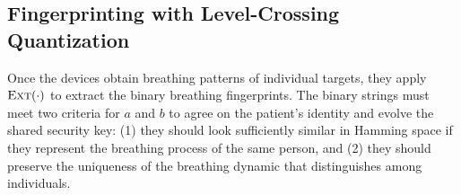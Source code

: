 
\subsection{Fingerprinting with Level-Crossing Quantization}
\label{section:respiration fingerprinting}


Once the devices obtain breathing patterns of individual targets, they apply $\textsc{Ext} (\cdot)$ to extract the binary breathing fingerprints. The binary strings must meet two criteria for $a$ and $b$ to agree on the patient's identity and evolve the shared security key: (1) they should look sufficiently similar in Hamming space if they represent the breathing process of the same person, and (2) they should preserve the uniqueness of the breathing dynamic that distinguishes among individuals.

